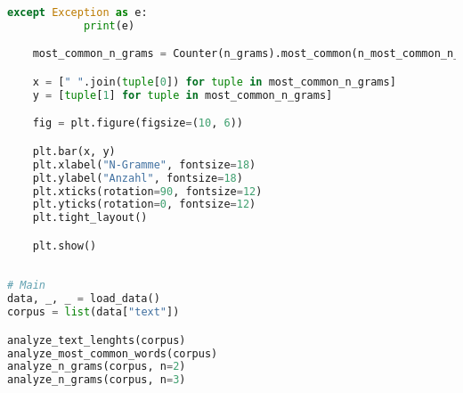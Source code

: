 \begin{lstlisting}[language=Python, caption=Datenexploration]
        except Exception as e:
            print(e)

    most_common_n_grams = Counter(n_grams).most_common(n_most_common_n_grams)

    x = [" ".join(tuple[0]) for tuple in most_common_n_grams]
    y = [tuple[1] for tuple in most_common_n_grams]

    fig = plt.figure(figsize=(10, 6))

    plt.bar(x, y)
    plt.xlabel("N-Gramme", fontsize=18)
    plt.ylabel("Anzahl", fontsize=18)
    plt.xticks(rotation=90, fontsize=12)
    plt.yticks(rotation=0, fontsize=12)
    plt.tight_layout()

    plt.show()
    
    
# Main
data, _, _ = load_data()
corpus = list(data["text"])

analyze_text_lenghts(corpus)
analyze_most_common_words(corpus)
analyze_n_grams(corpus, n=2)
analyze_n_grams(corpus, n=3)
\end{lstlisting}
